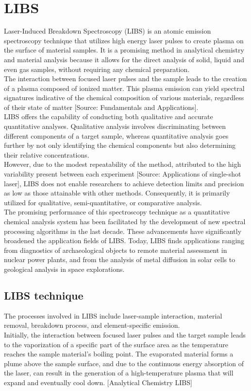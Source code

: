 \label{ch:experimental_techniques}

\section{LIBS}
\label{sec:LIBS}
Laser-Induced Breakdown Spectroscopy (LIBS) is an atomic emission spectroscopy technique that utilizes high energy laser pulses to create plasma on the surface of material samples. It is a promising method in analytical chemistry and material analysis because it allows for the direct analysis of solid, liquid and even gas samples, without requiring any chemical preparation.
\\
The interaction between focused laser pulses and the sample leads to the creation of a plasma composed of ionized matter. This plasma emission can yield spectral signatures indicative of the chemical composition of various materials, regardless of their state of matter [Source: Fundamentals and Applications].
\\
LIBS offers the capability of conducting both qualitative and accurate quantitative analyses. Qualitative analysis involves discriminating between different components of a target sample, whereas quantitative analysis goes further by not only identifying the chemical components but also determining their relative concentrations.
\\
However, due to the modest repeatability of the method, attributed to the high variability present between each experiment [Source: Applications of single-shot laser], LIBS does not enable researchers to achieve detection limits and precision as low as those attainable with other methods. Consequently, it is primarily utilized for qualitative, semi-quantitative, or comparative analysis.
\\
The promising performance of this spectroscopy technique as a quantitative chemical analysis system has been facilitated by the development of new spectral processing algorithms in the last decade. These advancements have significantly broadened the application fields of LIBS. Today, LIBS finds applications ranging from diagnostics of archaeological objects to remote material assessment in nuclear power plants, and from the analysis of metal diffusion in solar cells to geological analysis in space explorations.

\subsection{LIBS technique}
\label{subsec:LIBS_technique}
The processes involved in LIBS include laser-sample interaction, material removal, breakdown process, and element-specific emission.
\\
Initially, the interaction between focused laser pulses and the target sample leads to the vaporization of a specific part of the surface area as the temperature reaches the sample material’s boiling point. The evaporated material forms a plume above the sample surface, and due to the continuous energy absorption of the laser, can result in the generation of a high-temperature plasma that will expand and eventually cool down.
[Analytical Chemistry LIBS]

